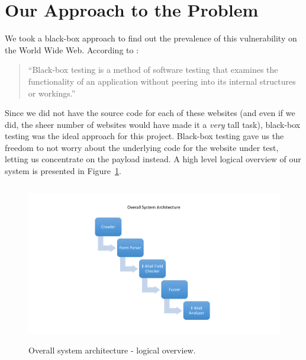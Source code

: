 \section[Approach]{Our Approach to the Problem}
\label{sys:appr}
We took a black-box approach to find out the prevalence of this vulnerability on the World Wide Web. According to \cite{wiki:Black-box_testing}:
\begin{quote}
	``{Black-box testing is a method of software testing that examines the functionality of an application without peering into its internal structures or workings.}''
\end{quote} 

Since we did not have the source code for each of these websites (and even if we did, the sheer number of websites would have made it a \emph{very} tall task), black-box testing was the ideal approach for this project.
Black-box testing gave us the freedom to not worry about the underlying code for the website under test, letting us concentrate on the payload instead. A high level logical overview of our system is presented in Figure~\ref{fig:overall}.

\begin{figure}
	\centering
	\includegraphics[width=14cm, height=7cm]{System/overall_design}
	\caption[]{Overall system architecture - logical overview.}
	\label{fig:overall}
\end{figure}

